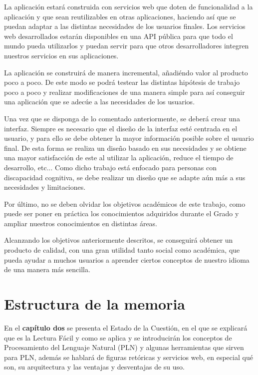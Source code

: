 La aplicación estará construida con servicios web que doten de funcionalidad a la aplicación y que sean reutilizables en otras aplicaciones, haciendo así que se puedan adaptar a las distintas necesidades de los usuarios finales.
Los servicios web desarrollados estarán disponibles en una API pública para que todo el mundo pueda utilizarlos y puedan servir para que otros desarrolladores integren nuestros servicios en sus aplicaciones.

La aplicación se construirá de manera incremental, añadiéndo valor al producto poco a poco. De este modo se podrá testear las distintas hipótesis de trabajo poco a poco y realizar modificaciones de una manera simple para así conseguir una aplicación que se adecúe a las necesidades de los usuarios.

Una vez que se disponga de lo comentado anteriormente, se deberá crear una interfaz. Siempre es necesario que el diseño de la interfaz esté centrada en el usuario, y para ello se debe obtener la mayor información posible sobre el usuario final. De esta forma se realiza un diseño basado en sus necesidades y se obtiene una mayor satisfacción de este al utilizar la aplicación, reduce el tiempo de desarrollo, etc...
Como dicho trabajo está enfocado para personas con discapacidad cognitiva, se debe realizar un diseño que se adapte aún más a sus necesidades y limitaciones.

Por último, no se deben olvidar los objetivos académicos de este trabajo, como puede ser poner en práctica los conocimientos adquiridos durante el Grado y ampliar nuestros conocimientos en distintas áreas. 

Alcanzando los objetivos anteriormente descritos, se conseguirá obtener un producto de calidad, con una gran utilidad tanto social como académica, que pueda ayudar a muchos usuarios a aprender ciertos conceptos de nuestro idioma de una manera más sencilla.
	
	
\section{Estructura de la memoria}
\label{cap:sec:estructuramemoria}


En el \textbf{capítulo dos} se presenta el Estado de la Cuestión, en el que se explicará que es la Lectura Fácil y como se aplica y se introducirán los conceptos de Procesamiento del Lenguaje Natural (PLN) y algunas herramientas que sirven para PLN, además se hablará de figuras retóricas y servicios web, en especial qué son, su arquitectura y las ventajas y desventajas de su uso.


